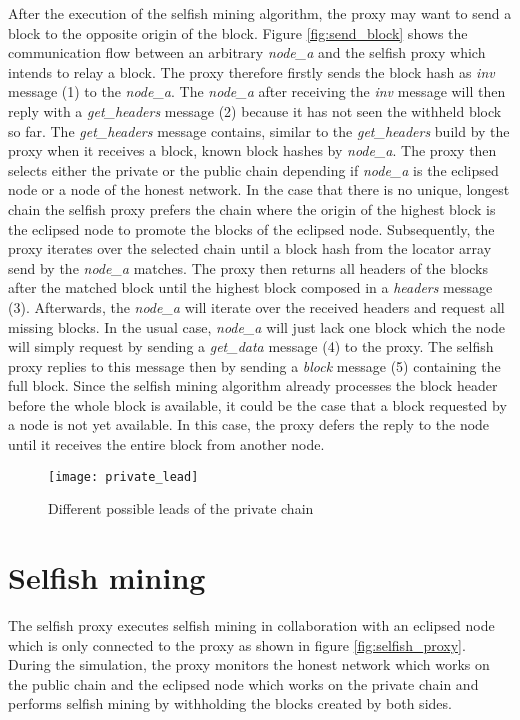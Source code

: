 After the execution of the selfish mining algorithm, the proxy may want to send a block to the opposite origin of the block.
Figure \ref{fig:send_block} shows the communication flow between an arbitrary \textit{node\_a} and the selfish proxy which intends to relay a block.
The proxy therefore firstly sends the block hash as \textit{inv} message (1) to the \textit{node\_a}.
The \textit{node\_a} after receiving the \textit{inv} message will then reply with a \textit{get\_headers} message (2) because it has not seen the withheld block so far.
The \textit{get\_headers} message contains, similar to the \textit{get\_headers} build by the proxy when it receives a block, known block hashes by \textit{node\_a}.
The proxy then selects either the private or the public chain depending if \textit{node\_a} is the eclipsed node or a node of the honest network.
In the case that there is no unique, longest chain the selfish proxy prefers the chain where the origin of the highest block is the eclipsed node to promote the blocks of the eclipsed node.
Subsequently, the proxy iterates over the selected chain until a block hash from the locator array send by the \textit{node\_a} matches.
The proxy then returns all headers of the blocks after the matched block until the highest block composed in a \textit{headers} message (3).
Afterwards, the \textit{node\_a} will iterate over the received headers and request all missing blocks.
In the usual case, \textit{node\_a} will just lack one block which the node will simply request by sending a \textit{get\_data} message (4) to the proxy.
The selfish proxy replies to this message then by sending a \textit{block} message (5) containing the full block.
Since the selfish mining algorithm already processes the block header before the whole block is available, it could be the case that a block requested by a node is not yet available.
In this case, the proxy defers the reply to the node until it receives the entire block from another node.

\begin{figure}[t]
\texttt{[image: private\_lead]}
\centering
\caption{Different possible leads of the private chain \cite{nayak2016stubborn}}
\label{fig:private_lead}
\end{figure}

\section{Selfish mining}

The selfish proxy executes selfish mining in collaboration with an eclipsed node which is only connected to the proxy as shown in figure \ref{fig:selfish_proxy}.
During the simulation, the proxy monitors the honest network which works on the public chain and the eclipsed node which works on the private chain and performs selfish mining by withholding the blocks created by both sides.

